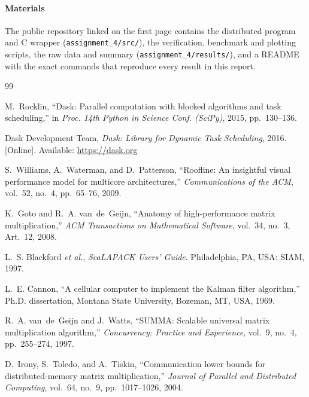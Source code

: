 \documentclass[conference,a4paper]{IEEEtran}
\newcommand{\code}[1]{\texttt{#1}}
\begin{document}
\paragraph{Materials} The public repository linked on the first page contains
the distributed program and C wrapper (\code{assignment\_4/src/}), the
verification, benchmark and plotting scripts, the raw data and summary
(\code{assignment\_4/results/}), and a README with the exact commands that
reproduce every result in this report.

\begingroup
\renewcommand{\section}[2]{}
\begin{thebibliography}{99}

M.~Rocklin, ``Dask: Parallel computation with blocked algorithms and task
scheduling,'' in \emph{Proc. 14th Python in Science Conf. (SciPy)}, 2015,
pp.~130--136.

Dask Development Team, \emph{Dask: Library for Dynamic Task Scheduling}, 2016.
[Online]. Available: \url{https://dask.org}

S.~Williams, A.~Waterman, and D.~Patterson, ``Roofline: An insightful visual
performance model for multicore architectures,'' \emph{Communications of the
ACM}, vol.~52, no.~4, pp.~65--76, 2009.

K.~Goto and R.~A. van~de~Geijn, ``Anatomy of high-performance matrix
multiplication,'' \emph{ACM Transactions on Mathematical Software}, vol.~34,
no.~3, Art.~12, 2008.

L.~S. Blackford \emph{et al.}, \emph{ScaLAPACK Users' Guide}. Philadelphia,
PA, USA: SIAM, 1997.

L.~E. Cannon, ``A cellular computer to implement the Kalman filter
algorithm,'' Ph.D. dissertation, Montana State University, Bozeman, MT, USA,
1969.

R.~A. van~de~Geijn and J.~Watts, ``SUMMA: Scalable universal matrix
multiplication algorithm,'' \emph{Concurrency: Practice and Experience},
vol.~9, no.~4, pp.~255--274, 1997.

D.~Irony, S.~Toledo, and A.~Tiskin, ``Communication lower bounds for
distributed-memory matrix multiplication,'' \emph{Journal of Parallel and
Distributed Computing}, vol.~64, no.~9, pp.~1017--1026, 2004.


\end{thebibliography}
\end{document}
